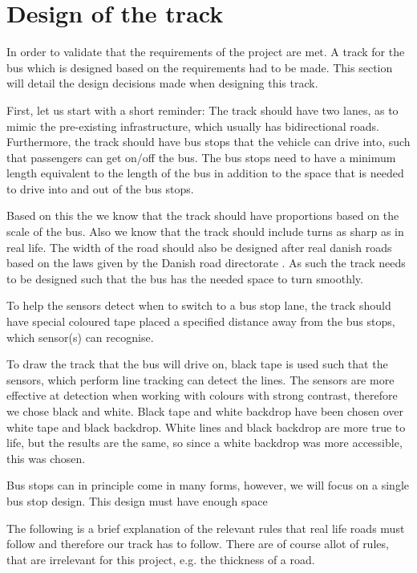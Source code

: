\section{Design of the track}\label{trackDesign}

In order to validate that the requirements of the project are met. A track for the bus which is designed based on the requirements had to be made. This section will detail the design decisions made when designing this track. 

First, let us start with a short reminder: The track should have two lanes, as to mimic the pre-existing infrastructure, which usually has bidirectional roads. Furthermore, the track should have bus stops that the vehicle can drive into, such that passengers can get on/off the bus. The bus stops need to have a minimum length equivalent to the length of the bus in addition to the space that is needed to drive into and out of the bus stops.

Based on this the we know that the track should have proportions based on the scale of the bus. Also we know that the track should include turns as sharp as in real life\cite{DriveingCurves}. The width of the road should also be designed after real danish roads based on the laws given by the Danish road directorate \cite{roadRules}.  As such the track needs to be designed such that the bus has the needed space to turn smoothly.

To help the sensors detect when to switch to a bus stop lane, the track should have special coloured tape placed a specified distance away from the bus stops, which sensor(s) can recognise.

To draw the track that the bus will drive on, black tape is used such that the sensors, which perform line tracking can detect the lines. The sensors are more effective at detection when working with colours with strong contrast, therefore we chose black and white. Black tape and white backdrop have been chosen over white tape and black backdrop. White lines and black backdrop are more true to life, but the results are the same, so since a white backdrop was more accessible, this was chosen.

Bus stops can in principle come in many forms, however, we will focus on a single bus stop design. This design must have enough space

The following is a brief explanation of the relevant rules that real life roads must follow and therefore our track has to follow. There are of course allot of rules, that are irrelevant for this project, e.g. the thickness of a road. 

